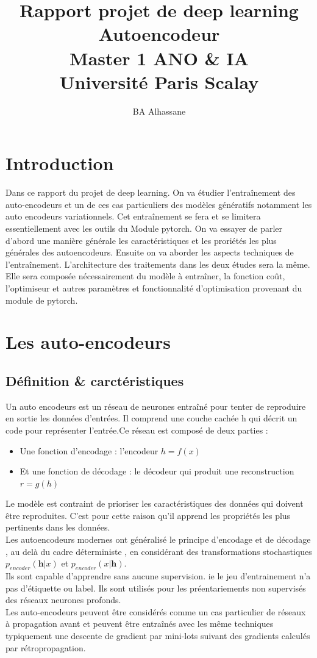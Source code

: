 \documentclass[12pt,a4paper]{report}
\author{BA Alhassane}
\title{Rapport projet de deep learning \\ Autoencodeur\\Master 1 ANO \& IA \\Université Paris Scalay }
\begin{document}
\maketitle 
\tableofcontents
\section{Introduction}


Dans ce rapport du projet de deep learning. On va étudier l’entraînement des auto-encodeurs et un de ces cas particuliers des modèles génératifs notamment les auto encodeurs  variationnels. Cet entraînement se fera et se limitera essentiellement avec les outils du Module pytorch. 
On va essayer de parler d'abord une manière générale les caractéristiques   et les proriétés  les plus générales des autoencodeurs. Ensuite on va aborder les aspects techniques de l’entraînement. L'architecture des traitements dans les deux études sera la même. Elle sera composée nécessairement du modèle à entraîner, la fonction coût, l'optimiseur et autres paramètres et fonctionnalité d'optimisation provenant du module de pytorch.  

\section{Les auto-encodeurs }

\subsection{Définition \& carctéristiques}
Un auto encodeurs est un réseau de neurones entraîné pour tenter de reproduire en sortie les données d'entrées. Il comprend une couche cachée h qui décrit un code pour représenter l'entrée.Ce réseau est composé de deux parties :
\begin{itemize}
\item Une fonction d'encodage : l'encodeur  $h=f(x)$
\item Et une fonction de décodage : le décodeur qui produit une reconstruction $r=g(h)$ 

\end{itemize}


Le modèle est contraint de prioriser les caractéristiques des données qui doivent être reproduites. C'est  pour cette raison qu'il apprend les propriétés les plus pertinents  dans les données. \\
Les autoencodeurs modernes ont généralisé le principe d'encodage et de décodage , au delà du cadre déterministe , en considérant des transformations stochastiques $p_{encoder}(\textbf{h} |x)$ et $p_{encoder}( x|\textbf{h})$.\\
Ils sont capable d'apprendre sans aucune supervision. ie le jeu d'entrainement n'a pas d'étiquette ou label. Ils sont utilisés pour les préentariements non supervisés des réseaux neurones profonds.\\
Les auto-encodeurs peuvent être considérés comme un cas particulier de réseaux à propagation avant et peuvent être entraînés avec les même techniques typiquement une descente de gradient par mini-lots suivant des gradients calculés par rétropropagation.
\end{document}
